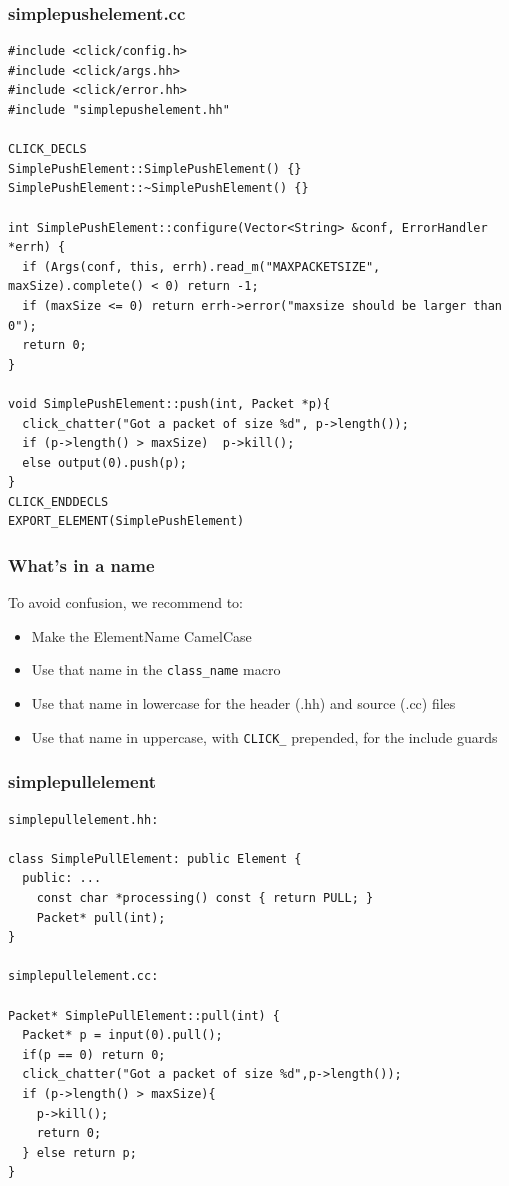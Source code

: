 \documentclass{beamer}
\begin{document}
\begin{frame}
\frametitle{simplepushelement.cc}
\begin{lstlisting}[basicstyle=\tiny\ttfamily]
#include <click/config.h>
#include <click/args.hh>
#include <click/error.hh>
#include "simplepushelement.hh"

CLICK_DECLS
SimplePushElement::SimplePushElement() {}
SimplePushElement::~SimplePushElement() {}

int SimplePushElement::configure(Vector<String> &conf, ErrorHandler *errh) {
  if (Args(conf, this, errh).read_m("MAXPACKETSIZE", maxSize).complete() < 0) return -1;
  if (maxSize <= 0) return errh->error("maxsize should be larger than 0");
  return 0;
}

void SimplePushElement::push(int, Packet *p){
  click_chatter("Got a packet of size %d", p->length());
  if (p->length() > maxSize)  p->kill();
  else output(0).push(p);
}
CLICK_ENDDECLS
EXPORT_ELEMENT(SimplePushElement)
\end{lstlisting}
\end{frame}

\begin{frame}[fragile]
\frametitle{What's in a name}
To avoid confusion, we recommend to:
\begin{itemize}
	\item Make the ElementName CamelCase
	\item Use that name in the \lstinline!class_name! macro
	\item Use that name in lowercase for the header (.hh) and source (.cc) files
	\item Use that name in uppercase, with \lstinline!CLICK_! prepended, for the include guards
\end{itemize}
\end{frame}

\begin{frame}[fragile]
\frametitle{simplepullelement}
\begin{lstlisting}[basicstyle=\tiny\ttfamily,emph={PULL},emphstyle=\underbar]
simplepullelement.hh:

class SimplePullElement: public Element { 
  public: ...
    const char *processing() const { return PULL; }
    Packet* pull(int);
}

simplepullelement.cc:

Packet* SimplePullElement::pull(int) {
  Packet* p = input(0).pull();
  if(p == 0) return 0;
  click_chatter("Got a packet of size %d",p->length());
  if (p->length() > maxSize){
    p->kill();
    return 0;
  } else return p;
}
\end{lstlisting}
\end{frame}
\end{document}
